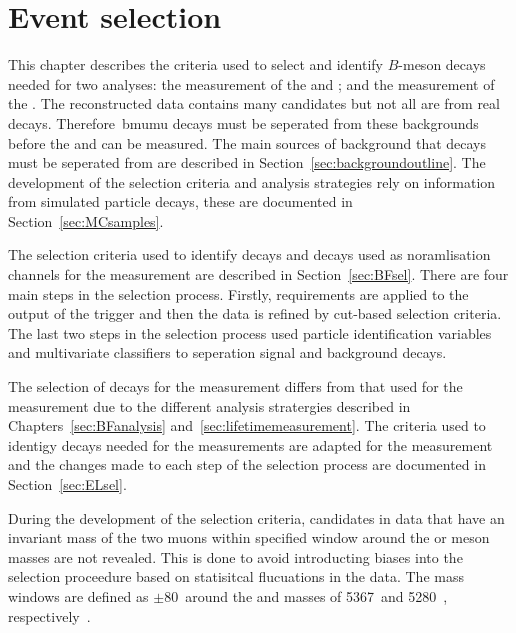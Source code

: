 \chapter{{\bf Event selection}}
\label{selection_chapter}

This chapter describes the criteria used to select and identify $B$-meson decays needed for two analyses: the measurement of the \bdmumu and \bsmumu \BFs; and the measurement of the \bsmumu \el. 
The reconstructed data contains many \bmumu candidates but not all are from real \bmumu decays. Therefore\ bmumu decays must be seperated from these backgrounds before the \BF and \el can be measured. The main sources of background that \bmumu decays must be seperated from are described in Section~\ref{sec:backgroundoutline}.
The development of the selection criteria and analysis strategies rely on information from simulated particle decays, these are documented in Section~\ref{sec:MCsamples}. 


The selection criteria used to identify \bmumu decays and decays used as noramlisation channels for the \BF measurement are described in Section~\ref{sec:BFsel}. There are four main steps in the selection process. Firstly, requirements are applied to the output of the trigger and then the data is refined by cut-based selection criteria. The last two steps in the selection process used particle identification variables and multivariate classifiers to seperation signal and background decays.

The selection of decays for the \el measurement differs from that used for the \BF measurement due to the different analysis stratergies described in Chapters~\ref{sec:BFanalysis} and~\ref{sec:lifetimemeasurement}. The criteria used to identigy decays needed for the \BF measurements are adapted for the \el measurement and the changes made to each step of the \BF selection process are documented in Section~\ref{sec:ELsel}. %

During the development of the selection criteria, \bmumu candidates in data that have an invariant mass of the two muons within specified window around the \bs or \bd meson masses are not revealed. This is done to avoid introducting biases into the selection proceedure based on statisitcal flucuations in the data. The mass windows are defined as $\pm 80$~\mevcc around the \bs and \bd masses of 5367~\mevcc and 5280~\mevcc, respectively~\cite{Olive:2016xmw}.

